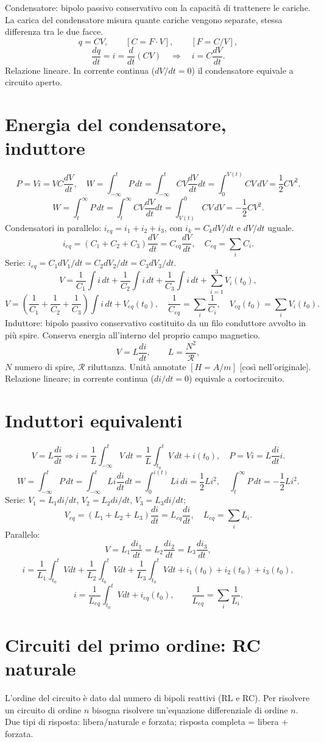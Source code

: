 \documentclass[11pt,a4paper]{article}
\newcommand{\pagina}[2]{\clearpage\section*{#2}}
\begin{document}
Condensatore: bipolo passivo conservativo con la capacità di trattenere le cariche. La carica del condensatore misura quante cariche vengono separate, stessa differenza tra le due facce.
\[q=CV,\qquad[C=F\cdot V],\qquad[F=C/V],\]
\[\frac{dq}{dt}=i=\frac d{dt}(CV)\quad\Longrightarrow\quad i=C\frac{dV}{dt}.\]
Relazione lineare. In corrente continua ($dV/dt=0$) il condensatore equivale a circuito aperto.
\pagina{16}{Energia del condensatore, induttore}
\[P=Vi=VC\frac{dV}{dt},\quad W=\int_{-\infty}^tP\,dt=\int_{-\infty}^tCV\frac{dV}{dt}dt=\int_0^{V(t)}CV\,dV=\frac12CV^2.\]
\[W=\int_t^\infty P\,dt=\int_t^\infty CV\frac{dV}{dt}dt=\int_{V(t)}^0CV\,dV=-\frac12CV^2.\]
Condensatori in parallelo: $i_{eq}=i_1+i_2+i_3$, con $i_k=C_kdV/dt$ e $dV/dt$ uguale.
\[i_{eq}=(C_1+C_2+C_3)\frac{dV}{dt}=C_{eq}\frac{dV}{dt},\quad C_{eq}=\sum_iC_i.\]
Serie: $i_{eq}=C_1dV_1/dt=C_2dV_2/dt=C_3dV_3/dt$.
\[V=\frac1{C_1}\int i\,dt+\frac1{C_2}\int i\,dt+\frac1{C_3}\int i\,dt+\sum_{i=1}^3V_i(t_0),\]
\[V=\left(\frac1{C_1}+\frac1{C_2}+\frac1{C_3}\right)\int i\,dt+V_{eq}(t_0),\quad \frac1{C_{eq}}=\sum_i\frac1{C_i},\quad V_{eq}(t_0)=\sum_iV_i(t_0).\]
Induttore: bipolo passivo conservativo costituito da un filo conduttore avvolto in più spire. Conserva energia all'interno del proprio campo magnetico.
\[V=L\frac{di}{dt},\qquad L=\frac{N^2}{\mathcal R},\]
$N$ numero di spire, $\mathcal R$ riluttanza. Unità annotate $[H=A/m]$ [così nell'originale]. Relazione lineare; in corrente continua ($di/dt=0$) equivale a cortocircuito.
\pagina{17}{Induttori equivalenti}
\[V=L\frac{di}{dt}\Rightarrow i=\frac1L\int_{-\infty}^tV\,dt=\frac1L\int_{t_0}^tV\,dt+i(t_0),\quad P=Vi=L\frac{di}{dt}i.\]
\[W=\int_{-\infty}^tP\,dt=\int_{-\infty}^tLi\frac{di}{dt}dt=\int_0^{i(t)}Li\,di=\frac12Li^2,\quad \int_t^\infty P\,dt=-\frac12Li^2.\]
Serie: $V_1=L_1di/dt$, $V_2=L_2di/dt$, $V_3=L_3di/dt$;
\[V_{eq}=(L_1+L_2+L_3)\frac{di}{dt}=L_{eq}\frac{di}{dt},\quad L_{eq}=\sum_iL_i.\]
Parallelo:
\[V=L_1\frac{di_1}{dt}=L_2\frac{di_2}{dt}=L_3\frac{di_3}{dt},\]
\[i=\frac1{L_1}\int_{t_0}^tVdt+\frac1{L_2}\int_{t_0}^tVdt+\frac1{L_3}\int_{t_0}^tVdt+i_1(t_0)+i_2(t_0)+i_3(t_0),\]
\[i=\frac1{L_{eq}}\int_{t_0}^tVdt+i_{eq}(t_0),\qquad\frac1{L_{eq}}=\sum_i\frac1{L_i}.\]
\pagina{18}{Circuiti del primo ordine: RC naturale}
L'ordine del circuito è dato dal numero di bipoli reattivi (RL e RC). Per risolvere un circuito di ordine $n$ bisogna risolvere un'equazione differenziale di ordine $n$. Due tipi di risposta: libera/naturale e forzata; risposta completa = libera + forzata.
\end{document}
